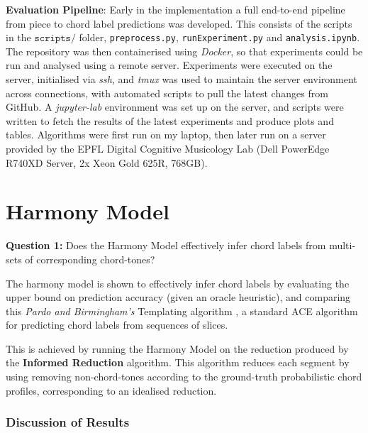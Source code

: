 \documentclass[12pt,a4paper,twoside,openany]{report} \usepackage[pdfborder={0 0 0}]{hyperref}    %
\theoremstyle{definition} \newtheorem{definition}{Definition}[section]
\begin{document}
\textbf{Evaluation Pipeline}: 
Early in the implementation a full end-to-end pipeline from piece to chord label
predictions was developed. This consists of the scripts in the $\texttt{scripts/}$ folder, \texttt{preprocess.py}, \texttt{runExperiment.py} and \texttt{analysis.ipynb}. 
The repository was then containerised using \textit{Docker}, so that experiments could be
run and analysed using a remote server. 
Experiments were executed on the server, initialised via \textit{ssh}, and \textit{tmux} was used to maintain the server
environment across connections, with automated scripts to pull the latest changes from GitHub. A \textit{jupyter-lab}
environment was set up on the server, and scripts were written to fetch the results of the latest experiments and produce plots and tables. 
Algorithms were first run on my laptop, then later run on a server provided by the EPFL Digital Cognitive Musicology Lab
(Dell PowerEdge R740XD Server, 2x Xeon Gold 625R, 768GB).

  \section{Harmony Model}
  \label{sec:evalHarmony}
  \textbf{Question 1: }Does the Harmony Model effectively infer chord labels from multi-sets of corresponding chord-tones?

  The harmony model is shown to effectively infer chord labels by evaluating the upper bound on prediction
  accuracy (given an oracle heuristic), and comparing this \textit{Pardo and Birmingham's} Templating algorithm \cite{pardoAlgorithmsChordalAnalysis2002},
  a standard ACE algorithm for predicting chord labels from sequences of slices.  

  This is achieved by running the Harmony Model on the reduction produced by the \textbf{Informed Reduction} algorithm.
  This algorithm reduces each segment by using removing non-chord-tones according to the ground-truth probabilistic
  chord profiles, corresponding to an idealised reduction. 

  \subsubsection{Discussion of Results}
\end{document}
